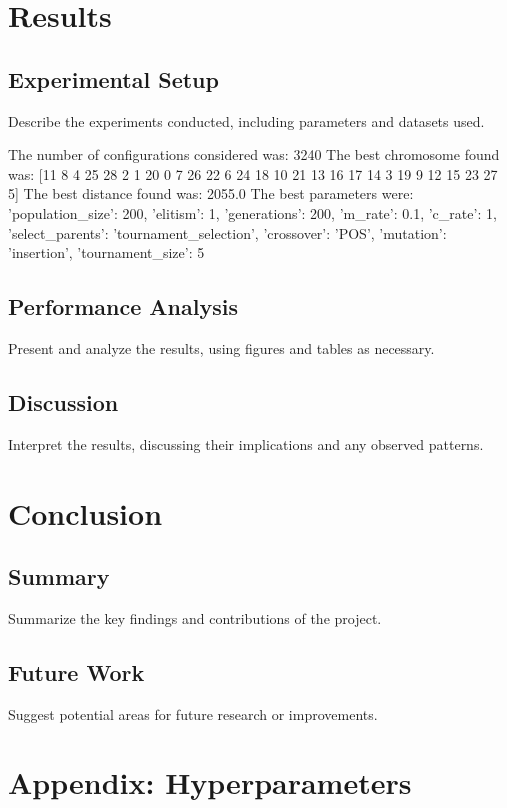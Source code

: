 \documentclass[12pt]{article}
\begin{document}
\begin{enumerate}
\section{Results}
\subsection{Experimental Setup}
Describe the experiments conducted, including parameters and datasets used.


The number of configurations considered was: 3240
The best chromosome found was: [11  8  4 25 28  2  1 20  0  7 26 22  6 24 18 10 21 13 16 17 14  3 19  9
 12 15 23 27  5]
The best distance found was: 2055.0
The best parameters were: {'population_size': 200, 'elitism': 1, 'generations': 200, 'm_rate': 0.1, 'c_rate': 1, 'select_parents': 'tournament_selection', 'crossover': 'POS', 'mutation': 'insertion', 'tournament_size': 5}


\subsection{Performance Analysis}
Present and analyze the results, using figures and tables as necessary.

\subsection{Discussion}
Interpret the results, discussing their implications and any observed patterns.

\section{Conclusion}
\subsection{Summary}
Summarize the key findings and contributions of the project.

\subsection{Future Work}
Suggest potential areas for future research or improvements.

\newpage
\printbibliography

\appendix
\section{Appendix: Hyperparameters}
\label{annex:parameters}

\end{enumerate}
\end{document}

